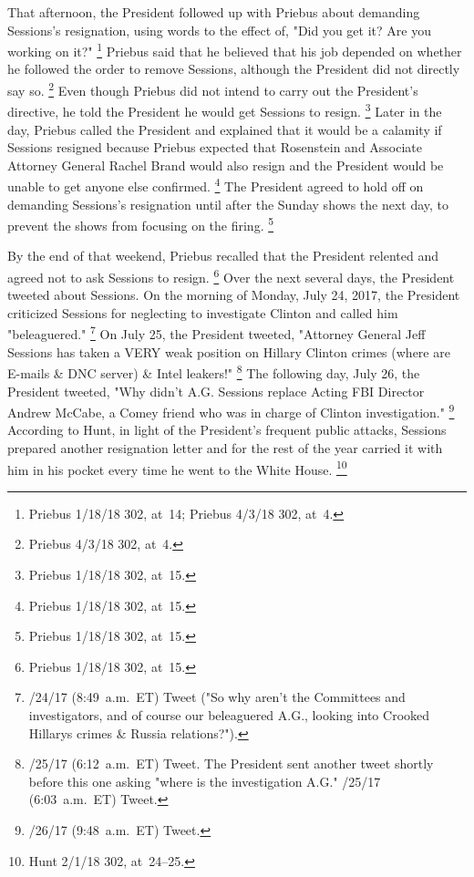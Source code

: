 {That afternoon, the President followed up with Priebus about demanding Sessions's resignation, using words to the effect of, "Did you get it?
Are you working on it?"%
\footnote{Priebus 1/18/18 302, at~14;
Priebus 4/3/18 302, at~4.}
Priebus said that he believed that his job depended on whether he followed the order to remove Sessions, although the President did not directly say so.%
\footnote{Priebus 4/3/18 302, at~4.}
Even though Priebus did not intend to carry out the President's directive, he told the President he would get Sessions to resign.%
\footnote{Priebus 1/18/18 302, at~15.}
Later in the day, Priebus called the President and explained that it would be a calamity if Sessions resigned because Priebus expected that Rosenstein and Associate Attorney General Rachel Brand would also resign and the President would be unable to get anyone else confirmed.%
\footnote{Priebus 1/18/18 302, at~15.}
The President agreed to hold off on demanding Sessions's resignation until after the Sunday shows the next day, to prevent the shows from focusing on the firing.%
\footnote{Priebus 1/18/18 302, at~15.}

By the end of that weekend, Priebus recalled that the President relented and agreed not to ask Sessions to resign.%
\footnote{Priebus 1/18/18 302, at~15.}
Over the next several days, the President tweeted about Sessions.
On the morning of Monday, July 24, 2017, the President criticized Sessions for neglecting to investigate Clinton and called him "beleaguered."%
\footnote{/24/17 (8:49~a.m.~ET) Tweet ("So why aren't the Committees and investigators, and of course our beleaguered A.G., looking into Crooked Hillarys crimes \& Russia relations?").}
On July 25, the President tweeted, "Attorney General Jeff Sessions has taken a VERY weak position on Hillary Clinton crimes (where are E-mails \& DNC server) \& Intel leakers!"%
\footnote{/25/17 (6:12~a.m.~ET) Tweet.
The President sent another tweet shortly before this one asking "where is the investigation A.G."
/25/17 (6:03~a.m.~ET) Tweet.}
The following day, July 26, the President tweeted, "Why didn't A.G. Sessions replace Acting FBI Director Andrew McCabe, a Comey friend who was in charge of Clinton investigation."%
\footnote{/26/17 (9:48~a.m.~ET) Tweet.}
According to Hunt, in light of the President's frequent public attacks, Sessions prepared another resignation letter and for the rest of the year carried it with him in his pocket every time he went to the White House.%
\footnote{Hunt 2/1/18 302, at~24--25.}

}

